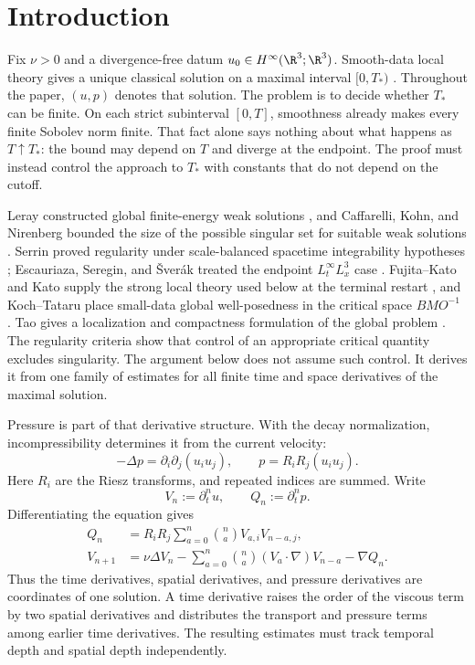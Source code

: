 \section{Introduction}
\label{sec:introduction}

Fix \(\nu>0\) and a divergence-free datum
\(u_0\in H^\infty(\R^3;\R^3)\).  Smooth-data local theory gives a unique
classical solution on a maximal interval \([0,T_*)\)
\cite{FujitaKato1964,Kato1984}.  Throughout the paper, \((u,p)\) denotes that
solution.  The problem is to decide whether \(T_*\) can be finite.  On each strict
subinterval \([0,T]\), smoothness already makes every finite Sobolev norm
finite.  That fact alone says nothing about what happens as \(T\uparrow T_*\):
the bound may depend on \(T\) and diverge at the endpoint.  The proof must
instead control the approach to \(T_*\) with constants that do not depend on
the cutoff.

Leray constructed global finite-energy weak solutions \cite{Leray1934}, and
Caffarelli, Kohn, and Nirenberg bounded the size of the possible singular set
for suitable weak solutions \cite{CKN1982}.  Serrin proved regularity under
scale-balanced spacetime integrability hypotheses \cite{Serrin1962};
Escauriaza, Seregin, and \v{S}ver\'ak treated the endpoint
\(L^\infty_tL^3_x\) case \cite{ESS2003}.  Fujita--Kato and Kato supply the
strong local theory used below at the terminal restart
\cite{FujitaKato1964,Kato1984}, and Koch--Tataru place small-data
global well-posedness in the critical space \(BMO^{-1}\)
\cite{KochTataru2001}.
Tao gives a localization and compactness formulation of the global problem
\cite{Tao2013}.  The regularity criteria show that control of an appropriate
critical quantity excludes singularity.  The argument below does not assume
such control.  It derives it from one family of estimates for all finite time
and space derivatives of the maximal solution.

Pressure is part of that derivative structure.  With the decay normalization,
incompressibility determines it from the current velocity:
\[
 -\Delta p=\partial_i\partial_j(u_i u_j),
 \qquad
 p=R_iR_j(u_i u_j).
\]
Here \(R_i\) are the Riesz transforms, and repeated indices are summed.
Write
\[
 V_n:=\partial_t^nu,
 \qquad
 Q_n:=\partial_t^np.
\]
Differentiating the equation gives
\begin{align}
 Q_n
 &=R_iR_j\sum_{a=0}^{n}\binom naV_{a,i}V_{n-a,j},
 \label{eq:intro-pressure-recurrence}\\
 V_{n+1}
 &=\nu\Delta V_n
 -\sum_{a=0}^{n}\binom na(V_a\cdot\nabla)V_{n-a}
 -\nabla Q_n.
 \label{eq:intro-velocity-recurrence}
\end{align}
Thus the time derivatives, spatial derivatives, and pressure derivatives are
coordinates of one solution.  A time derivative raises the order of the
viscous term by two spatial derivatives and distributes the transport and
pressure terms among earlier time derivatives.  The resulting estimates must
track temporal depth and spatial depth independently.

